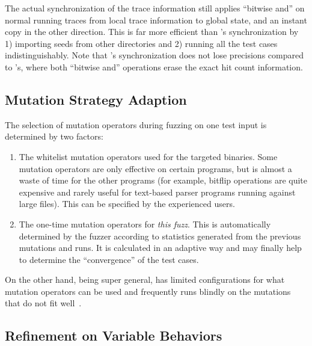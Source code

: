 The actual synchronization of the trace information still applies ``bitwise and'' on normal running traces from local trace information to global state, and an instant copy in the other direction. This is far more efficient than {\AFL}'s synchronization by 1) importing seeds from other directories and 2) running all the test cases indistinguishably. Note that {\FOT}'s synchronization does not lose precisions compared to {\AFL}'s, where both ``bitwise and'' operations erase the exact hit count information.


  \subsection{Mutation Strategy Adaption}\label{sec:mutation_ops}
 The selection of mutation operators during fuzzing on one test input is determined by two factors:
 \begin{enumerate}
 	\item The whitelist mutation operators used for the targeted binaries. Some mutation operators are only effective on certain programs, but is almost a waste of time for the other programs (for example, bitflip operations are quite expensive and rarely useful for text-based parser programs running against large files). This can be specified by the experienced {\FOT} users.
 	\item The one-time mutation operators for \emph{this fuzz}. This is automatically determined by the fuzzer according to statistics generated from the previous mutations and runs. It is calculated in an adaptive way and may finally help to determine the ``convergence'' of the test cases.
 \end{enumerate}

On the other hand, being super general, {\AFL} has limited configurations for what mutation operators can be used and frequently runs blindly on the mutations that do not fit well~\cite{junjie:2017sp:skyfire,mopt-fuzz}.


\subsection{Refinement on Variable Behaviors}\label{sec:entry_var_behavior}


